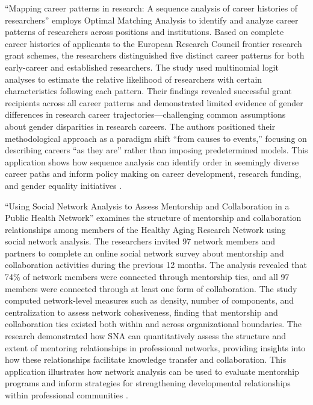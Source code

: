 \documentclass[main.tex]{subfiles}
\begin{document}
``Mapping career patterns in research: A sequence analysis of career histories of researchers'' employs Optimal Matching Analysis to identify and analyze career patterns of researchers across positions and institutions. Based on complete career histories of applicants to the European Research Council frontier research grant schemes, the researchers distinguished five distinct career patterns for both early-career and established researchers. The study used multinomial logit analyses to estimate the relative likelihood of researchers with certain characteristics following each pattern. Their findings revealed successful grant recipients across all career patterns and demonstrated limited evidence of gender differences in research career trajectories—challenging common assumptions about gender disparities in research careers. The authors positioned their methodological approach as a paradigm shift ``from causes to events,'' focusing on describing careers ``as they are'' rather than imposing predetermined models. This application shows how sequence analysis can identify order in seemingly diverse career paths and inform policy making on career development, research funding, and gender equality initiatives \parencite{pmc2015mapping}.

``Using Social Network Analysis to Assess Mentorship and Collaboration in a Public Health Network'' examines the structure of mentorship and collaboration relationships among members of the Healthy Aging Research Network using social network analysis. The researchers invited 97 network members and partners to complete an online social network survey about mentorship and collaboration activities during the previous 12 months. The analysis revealed that 74\% of network members were connected through mentorship ties, and all 97 members were connected through at least one form of collaboration. The study computed network-level measures such as density, number of components, and centralization to assess network cohesiveness, finding that mentorship and collaboration ties existed both within and across organizational boundaries. The research demonstrated how SNA can quantitatively assess the structure and extent of mentoring relationships in professional networks, providing insights into how these relationships facilitate knowledge transfer and collaboration. This application illustrates how network analysis can be used to evaluate mentorship programs and inform strategies for strengthening developmental relationships within professional communities \parencite{cdc2015network}.
\end{document}
